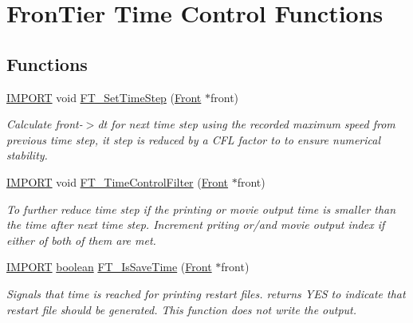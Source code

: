 \hypertarget{group___t_i_m_e}{}\section{Fron\+Tier Time Control Functions}
\label{group___t_i_m_e}
\subsection*{Functions}
\begin{DoxyCompactItemize}
\item 
\hyperlink{cdecs_8h_a773175d74e73776d69c3e538f17de1ee}{I\+M\+P\+O\+RT} void \hyperlink{group___t_i_m_e_ga09741004fb2b7edfeb175a53c99c9b0a}{F\+T\+\_\+\+Set\+Time\+Step} (\hyperlink{fdecs_8h_ac32202b798f848095c489cfd04c4ca5f}{Front} $\ast$front)
\begin{DoxyCompactList}\small\item\em Calculate front-\/$>$dt for next time step using the recorded maximum speed from previous time step, it step is reduced by a C\+FL factor to to ensure numerical stability. \end{DoxyCompactList}\item 
\hyperlink{cdecs_8h_a773175d74e73776d69c3e538f17de1ee}{I\+M\+P\+O\+RT} void \hyperlink{group___t_i_m_e_gadd79a047c81eb97b79756e6798bde8e3}{F\+T\+\_\+\+Time\+Control\+Filter} (\hyperlink{fdecs_8h_ac32202b798f848095c489cfd04c4ca5f}{Front} $\ast$front)
\begin{DoxyCompactList}\small\item\em To further reduce time step if the printing or movie output time is smaller than the time after next time step. Increment priting or/and movie output index if either of both of them are met. \end{DoxyCompactList}\item 
\hyperlink{cdecs_8h_a773175d74e73776d69c3e538f17de1ee}{I\+M\+P\+O\+RT} \hyperlink{cdecs_8h_ad048433382a936258fb49e2ec4f148e1}{boolean} \hyperlink{group___t_i_m_e_gaaa75f808bfc48b58cef67f5db0e63b20}{F\+T\+\_\+\+Is\+Save\+Time} (\hyperlink{fdecs_8h_ac32202b798f848095c489cfd04c4ca5f}{Front} $\ast$front)
\begin{DoxyCompactList}\small\item\em Signals that time is reached for printing restart files. returns Y\+ES to indicate that restart file should be generated. This function does not write the output. \end{DoxyCompactList}\item 

\end{DoxyCompactItemize}
